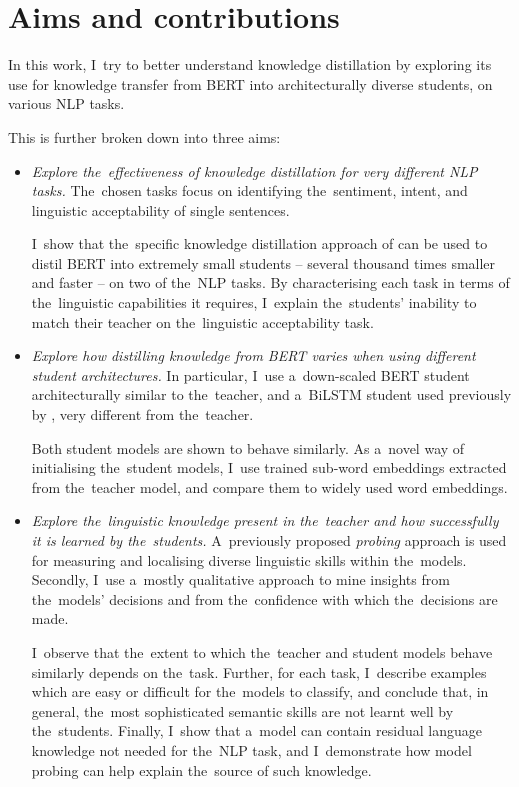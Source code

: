 \documentclass[bsc,frontabs,singlespacing,parskip,deptreport]{infthesis}
\begin{document}
{  \section{Aims and contributions}{
    In this work, I~try to better understand knowledge distillation by exploring its use for knowledge transfer from BERT into architecturally diverse students, on various NLP tasks.

    This is further broken down into three aims:
    \begin{itemize}
      \item{
        \textit{Explore the~effectiveness of knowledge distillation for very different NLP tasks.}
        The~chosen tasks focus on identifying the~sentiment, intent, and linguistic acceptability of single sentences.
        
        I~show that the~specific knowledge distillation approach of \citet{Tang_2019b} can be used to distil BERT into extremely small students -- several thousand times smaller and faster -- on two of the~NLP tasks.
        By characterising each task in terms of the~linguistic capabilities it requires, I~explain the~students' inability to match their teacher on the~linguistic acceptability task.
        }
      \item{
        \textit{Explore how distilling knowledge from BERT varies when using different student architectures.}
        In particular, I~use a~down-scaled BERT student architecturally similar to the~teacher, and a~BiLSTM student used previously by \citet{Tang_2019a,Tang_2019b}, very different from the~teacher.

        Both student models are shown to behave similarly.
        As a~novel way of initialising the~student models, I~use trained sub-word embeddings extracted from the~teacher model, and compare them to widely used word embeddings.
        }
      \item{
        \textit{Explore the~linguistic knowledge present in the~teacher and how successfully it is learned by the~students.}
        A~previously proposed \textit{probing} approach \citep{Conneau_2018} is used for measuring and localising diverse linguistic skills within the~models.
        Secondly, I~use a~mostly qualitative approach to mine insights from the~models' decisions and from the~confidence with which the~decisions are made.
        
        I~observe that the~extent to which the~teacher and student models behave similarly depends on the~task.        
        Further, for each task, I~describe examples which are easy or difficult for the~models to classify, and conclude that, in general, the~most sophisticated semantic skills are not learnt well by the~students.
        Finally, I~show that a~model can contain residual language knowledge not needed for the~NLP task, and I~demonstrate how model probing can help explain the~source of such knowledge.
      }
    \end{itemize}
  }
}
\end{document}
